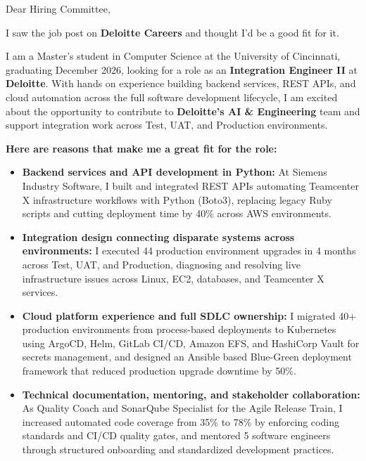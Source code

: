 \documentclass[11pt]{letter}
\date{}
\begin{document}
\begin{letter}{}

\opening{Dear Hiring Committee,}

I saw the job post on \textbf{Deloitte Careers} and thought I'd be a good fit for it.

I am a Master's student in Computer Science at the University of Cincinnati, graduating December 2026, looking for a role as an \textbf{Integration Engineer II} at \textbf{Deloitte}. With hands on experience building backend services, REST APIs, and cloud automation across the full software development lifecycle, I am excited about the opportunity to contribute to \textbf{Deloitte's AI \& Engineering} team and support integration work across Test, UAT, and Production environments.

\textbf{Here are reasons that make me a great fit for the role:}

\begin{itemize}[leftmargin=*, itemsep=0.45em]
    \item \textbf{Backend services and API development in Python:} At Siemens Industry Software, I built and integrated REST APIs automating Teamcenter X infrastructure workflows with Python (Boto3), replacing legacy Ruby scripts and cutting deployment time by 40\% across AWS environments.

    \item \textbf{Integration design connecting disparate systems across environments:} I executed 44 production environment upgrades in 4 months across Test, UAT, and Production, diagnosing and resolving live infrastructure issues across Linux, EC2, databases, and Teamcenter X services.

    \item \textbf{Cloud platform experience and full SDLC ownership:} I migrated 40+ production environments from process-based deployments to Kubernetes using ArgoCD, Helm, GitLab CI/CD, Amazon EFS, and HashiCorp Vault for secrets management, and designed an Ansible based Blue-Green deployment framework that reduced production upgrade downtime by 50\%.

    \item \textbf{Technical documentation, mentoring, and stakeholder collaboration:} As Quality Coach and SonarQube Specialist for the Agile Release Train, I increased automated code coverage from 35\% to 78\% by enforcing coding standards and CI/CD quality gates, and mentored 5 software engineers through structured onboarding and standardized development practices.
\end{itemize}


\end{letter}
\end{document}

